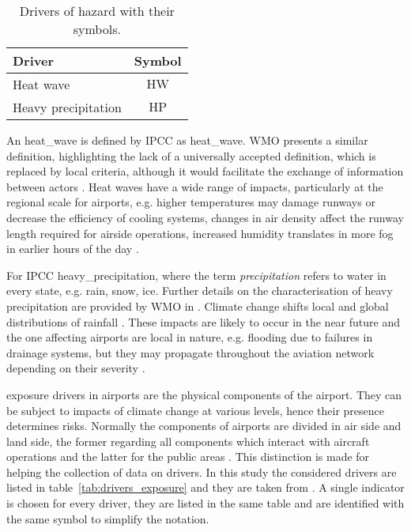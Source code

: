\begin{table}[h]
  \centering
  \caption{Drivers of hazard with their symbols.}
  \label{tab:drivers_hazard}
  \begin{tabular}{lc}
    Driver              & Symbol        \\
    \hline
    Heat wave           & $\mathrm{HW}$ \\
    Heavy precipitation & $\mathrm{HP}$ \\
  \end{tabular}
\end{table}

An \gls{heat_wave} is defined by \gls{IPCC} as \glsdesc{heat_wave}. \Gls{WMO} presents a similar definition, highlighting the lack of a universally accepted definition, which is replaced by local criteria, although it would facilitate the exchange of information between actors \cite[5]{2023WorldMeteorologicalOrganizationWMOGuidelinesOn}. Heat waves have a wide range of impacts, particularly at the regional scale for airports, e.g. higher temperatures may damage runways or decrease the efficiency of cooling systems, changes in air density affect the runway length required for airside operations, increased humidity translates in more fog in earlier hours of the day \cite[23-28]{2018ICAOClimateAdaptation}.

For \gls{IPCC} \glsdesc{heavy_precipitation}, where the term \emph{precipitation} refers to water in every state, e.g. rain, snow, ice. Further details on the characterisation of heavy precipitation are provided by \gls{WMO} in \cite[6-7]{2023WorldMeteorologicalOrganizationWMOGuidelinesOn}. Climate change shifts local and global distributions of rainfall \cite[1605]{2021SeneviratneWeatherAnd}. These impacts are likely to occur in the near future and the one affecting airports are local in nature, e.g. flooding due to failures in drainage systems, but they may propagate throughout the aviation network depending on their severity \cite[28-34]{2018ICAOClimateAdaptation}.

\Gls{exposure} \glspl{driver} in airports are the physical components of the airport. They can be subject to \glspl{impact} of climate change at various levels, hence their presence determines \glspl{risk}. Normally the components of airports are divided in air side and land side, the former regarding all components which interact with aircraft operations and the latter for the public areas \cite[553]{2022DeVivoRiskAssessment}. This distinction is made for helping the collection of data on drivers.
In this study the considered drivers are listed in table~\ref{tab:drivers_exposure} and they are taken from \cite[554]{2022DeVivoRiskAssessment}. A single \gls{indicator} is chosen for every driver, they are listed in the same table and are identified with the same symbol to simplify the notation.

